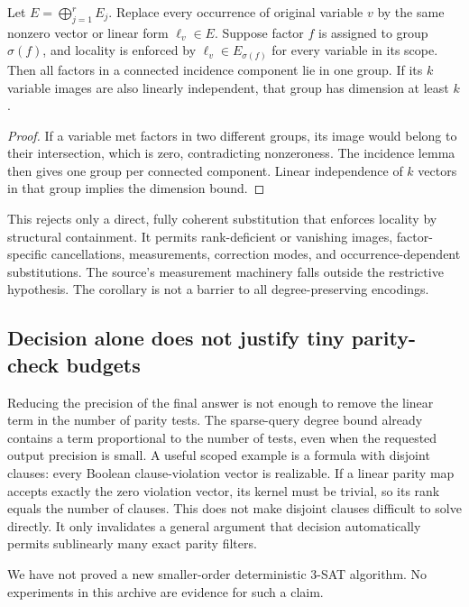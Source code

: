 \begin{corollary}
Let \(E=\bigoplus_{j=1}^r E_j\). Replace every occurrence of original
variable \(v\) by the same nonzero vector or linear form \(\ell_v\in E\).
Suppose factor \(f\) is assigned to group \(\sigma(f)\), and locality is
enforced by \(\ell_v\in E_{\sigma(f)}\) for every variable in its scope.
Then all factors in a connected incidence component lie in one group.
If its \(k\) variable images are also linearly independent, that group
has dimension at least \(k\).
\end{corollary}
\begin{proof}
If a variable met factors in two different groups, its image would belong
to their intersection, which is zero, contradicting nonzeroness.
The incidence lemma then gives one group per connected component.
Linear independence of \(k\) vectors in that group implies the dimension
bound.
\end{proof}

This rejects only a direct, fully coherent substitution that enforces
locality by structural containment. It permits rank-deficient or vanishing
images, factor-specific cancellations, measurements, correction modes,
and occurrence-dependent substitutions. The source's measurement
machinery falls outside the restrictive hypothesis. The corollary is not
a barrier to all degree-preserving encodings.

\subsection{Decision alone does not justify tiny parity-check budgets}

Reducing the precision of the final answer is not enough to remove the
linear term in the number of parity tests. The sparse-query degree bound
already contains a term proportional to the number of tests, even when
the requested output precision is small.
A useful scoped example is a formula with disjoint clauses: every
Boolean clause-violation vector is realizable. If a linear parity map
accepts exactly the zero violation vector, its kernel must be trivial,
so its rank equals the number of clauses.
This does not make disjoint clauses difficult to solve directly. It only
invalidates a general argument that decision automatically permits
sublinearly many exact parity filters.

We have not proved a new smaller-order deterministic 3-SAT algorithm.
No experiments in this archive are evidence for such a claim.


